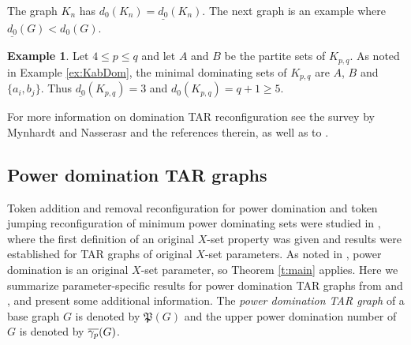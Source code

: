\documentclass{article}
\numberwithin{figure}{section}
\numberwithin{table}{section}
\numberwithin{equation}{section}
\theoremstyle{definition}
\theoremstyle{definition}
\theoremstyle{definition}
\newtheorem{ex}[thm]{Example}
\newcommand{\pdtar}{\mathfrak{P}}%
\newcommand{\ddo}{d_0}
\newcommand{\uldo}{\underline{d_0}}
\begin{document}
{ The graph $K_n$ has $\ddo(K_n)=\uldo(K_n)$. The next graph is an example where $\uldo(G)< \ddo(G)$. 


\begin{ex}\label{ex:KabDom2}
 Let $4\le p\le q$ and let $A$ and $B$ be the partite sets of $K_{p,q}$. As noted in Example \ref{ex:KabDom}, the minimal dominating sets of $K_{p,q}$ are  $A$, $B$ and $\{a_i,b_j\}$.  Thus $\uldo(K_{p,q})=3$ and $\ddo(K_{p,q})= q+1\ge 5$.
\end{ex}


For more information on domination TAR reconfiguration see the survey by Mynhardt and Nasserasr \cite{MS20}  and the references therein, as well as to \cite{HS14, HS17, MTR19, SMN14}.


\subsection{Power domination TAR graphs}\label{ss:PD}



Token addition and removal reconfiguration  for power domination and  token jumping reconfiguration of minimum power dominating sets were studied  in \cite{PDrecon}, where  the first definition  of an original $X$-set property was given and  results  were established for  TAR graphs of original $X$-set parameters.  As noted in \cite{XTARiso}, power domination is an original $X$-set parameter, so Theorem \ref{t:main} applies. 
Here we summarize parameter-specific results for power domination TAR graphs from \cite{PDrecon} and \cite{XTARiso}, and present some additional information.  The \emph{power domination TAR graph}  of a  base graph  $G$ is denoted by  $\pdtar(G)$ and the upper power domination number of $G$ is denoted by $\overline{\gamma_p}(G)$.

}
\end{document}
